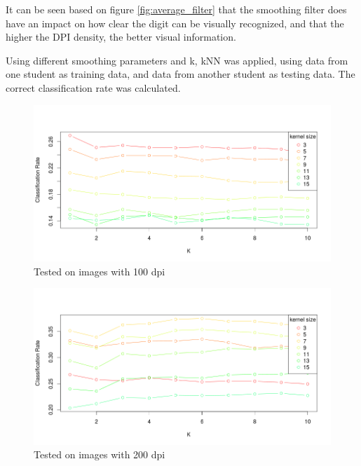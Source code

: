 It can be seen based on figure \ref{fig:average_filter} that the smoothing
 filter does have an impact on how clear the digit can be visually
 recognized, and that the higher the DPI density,
  the better visual information. 

Using different smoothing parameters and k, kNN was applied,
using data from one student as training data, and data from another student as testing data.
The correct classification rate was calculated.

\begin{figure}[H]
	\centering
		\includegraphics[width = \textwidth]{Figure/data_100_15_10.png}
		\caption{Tested on images with 100 dpi}
		\label{fig:data_100}
\end{figure}

\begin{figure}[H]
	\centering	
		\includegraphics[width = \textwidth]{Figure/data_200_15_10.png}
		\caption{Tested on images with 200 dpi}
		\label{fig:data_200}
\end{figure}


